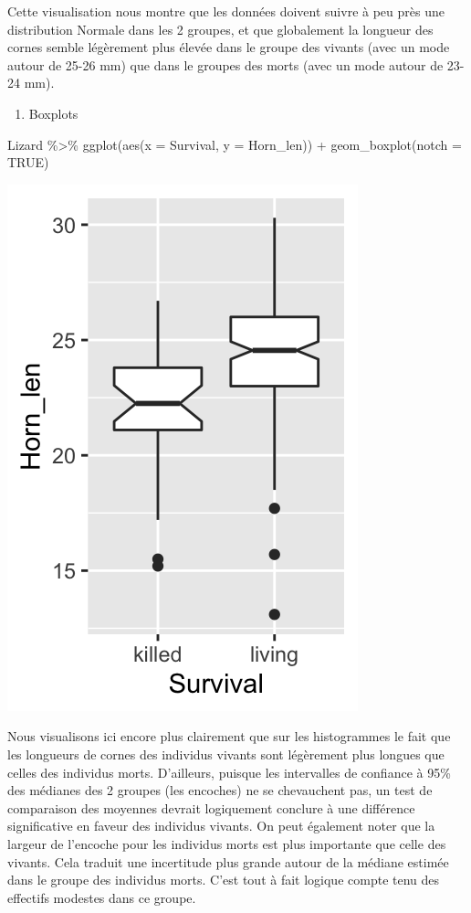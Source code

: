 \documentclass[
  a4paper,
]{article}
\newenvironment{Shaded}{\begin{snugshade}}{\end{snugshade}}
\newcommand{\AttributeTok}[1]{\textcolor[rgb]{0.00,0.34,0.68}{#1}}
\newcommand{\ConstantTok}[1]{\textcolor[rgb]{0.67,0.33,0.00}{#1}}
\newcommand{\FunctionTok}[1]{\textcolor[rgb]{0.39,0.29,0.61}{#1}}
\newcommand{\NormalTok}[1]{\textcolor[rgb]{0.12,0.11,0.11}{#1}}
\newcommand{\SpecialCharTok}[1]{\textcolor[rgb]{0.24,0.68,0.91}{#1}}
\providecommand{\tightlist}{%
  \setlength{\itemsep}{0pt}\setlength{\parskip}{0pt}}
\begin{document}
Cette visualisation nous montre que les données doivent suivre à peu près une distribution Normale dans les 2 groupes, et que globalement la longueur des cornes semble légèrement plus élevée dans le groupe des vivants (avec un mode autour de 25-26 mm) que dans le groupes des morts (avec un mode autour de 23-24 mm).

\begin{enumerate}
\def\labelenumi{\arabic{enumi}.}
\setcounter{enumi}{2}
\tightlist
\item
  Boxplots
\end{enumerate}

\begin{Shaded}
\begin{Highlighting}[]
\NormalTok{Lizard }\SpecialCharTok{\%\textgreater{}\%} 
  \FunctionTok{ggplot}\NormalTok{(}\FunctionTok{aes}\NormalTok{(}\AttributeTok{x =}\NormalTok{ Survival, }\AttributeTok{y =}\NormalTok{ Horn\_len)) }\SpecialCharTok{+}
  \FunctionTok{geom\_boxplot}\NormalTok{(}\AttributeTok{notch =} \ConstantTok{TRUE}\NormalTok{)}
\end{Highlighting}
\end{Shaded}

\begin{center}\includegraphics[width=0.25\linewidth]{figure/unnamed-chunk-52-1} \end{center}

Nous visualisons ici encore plus clairement que sur les histogrammes le fait que les longueurs de cornes des individus vivants sont légèrement plus longues que celles des individus morts. D'ailleurs, puisque les intervalles de confiance à 95\% des médianes des 2 groupes (les encoches) ne se chevauchent pas, un test de comparaison des moyennes devrait logiquement conclure à une différence significative en faveur des individus vivants. On peut également noter que la largeur de l'encoche pour les individus morts est plus importante que celle des vivants. Cela traduit une incertitude plus grande autour de la médiane estimée dans le groupe des individus morts. C'est tout à fait logique compte tenu des effectifs modestes dans ce groupe.
\end{document}

